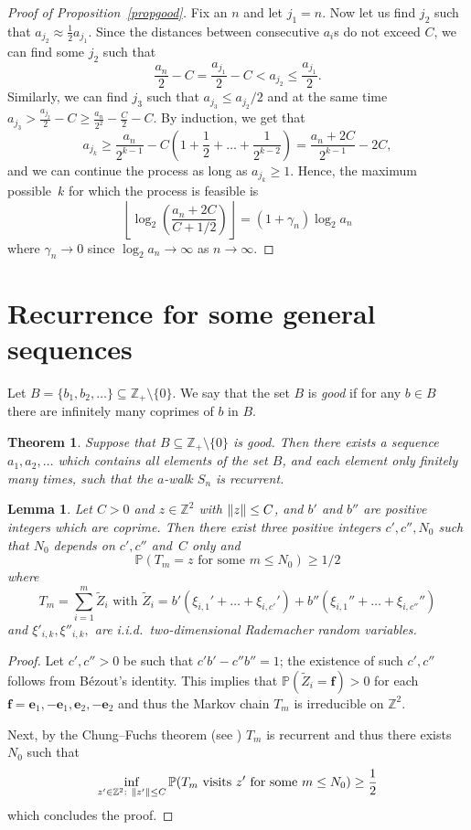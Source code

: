 \documentclass[12pt]{article}
\newtheorem{theorem}{Theorem}
\newtheorem{lemma}{Lemma}
\renewcommand\P{\mathbb{P}}
\newcommand\Z{\mathbb{Z}}
\newcommand\g{\gamma}
\newcommand\be{\mathbf{e}}
\DeclarePairedDelimiter{\norm}{\lVert}{\rVert}
\begin{document}
\begin{proof}[Proof of Proposition~\ref{propgood}]
Fix an $n$ and let $j_1=n$. Now let us find $j_2$ such that $a_{j_2}\approx \frac12 a_{j_1}$. Since the distances between consecutive $a_i$s do not exceed $C$, we can find some $j_2$ such that
$$
\frac{a_{n}}2-C=\frac{a_{j_1}}2-C< a_{j_2}\le \frac{a_{j_1}}2.
$$
Similarly, we can find $j_3$ such that $a_{j_3}\le a_{j_2}/2$ and at the same time
$
 a_{j_3}> \frac{a_{j_2}}2-C\ge \frac{a_{n}}{2^2}-\frac C2-C.
$
By induction, we get that
$$
a_{j_k}\ge \frac{a_n}{2^{k-1}}-C\left(1+\frac12+\dots+\frac1{2^{k-2}}\right)=
\frac{a_n+2C}{2^{k-1}}-2C,
$$
and we can continue the process as long as $a_{j_k}\ge 1$. Hence, the maximum possible~$k$ for which the process is feasible is 
$$
\left\lfloor \log_2\left(  \frac{a_n+2C}{C+1/2}\right) \right\rfloor
=(1+\g_n)\log_2 a_n
$$
where $\g_n\to 0$ since $\log_2 a_n\to\infty$ as $n\to\infty$.
\end{proof}

\section{Recurrence for some general sequences}\label{SecR}

Let $B=\{b_1,b_2,\dots\}\subseteq \Z_+\setminus\{0\}$. We say that the set $B$ is {\em good} if for any $b\in B$ there are infinitely many coprimes of $b$ in $B$. 

\begin{theorem}\label{trec}
Suppose that $B\subseteq \Z_+\setminus\{0\}$ is good. Then there exists a sequence $a_1,a_2,\dots$   which contains all elements of the set $B$, and each element only finitely many times, such that the $a$-walk $S_n$ is recurrent.
\end{theorem}

\begin{lemma}\label{lemmaCF}
Let $C>0$ and $z\in\Z^2$ with $\norm{z}\le C$, and $b'$ and $b''$ are positive integers which are coprime. Then there exist three positive integers $c',c'', N_0$  such that $N_0$ depends on $c',c''$ and~$C$ only and
$$
\P(T_m=z\text{ for some }m\le N_0)\ge 1/2
$$
where
$$
T_m=\sum_{i=1}^m \tilde Z_i    \text{     with }
\tilde Z_i=b'(\xi_{i,1}'+\dots+\xi_{i,c'}')+b''(\xi_{i,1}''+\dots+\xi_{i,c''}'')
$$
and $\xi'_{i,k},\xi''_{i,k},$  are i.i.d.\ two-dimensional Rademacher random variables.  
\end{lemma}
\begin{proof}
Let $c',c''>0$ be such that $c'b'-c''b''=1$; the existence of such $c',c''$ follows from Bézout's identity. This implies that $\P(\tilde Z_i=\mathbf{f})> 0$  for each $\mathbf{f}=\be_1,-\be_1,\be_2,-\be_2$ and thus the Markov chain $T_m$ is irreducible on $\Z^2$.  

Next, by the Chung–Fuchs theorem (see \cite{Chung}) $T_m$ is recurrent and thus there exists $N_0$ such that 
$$
\inf_{z'\in \Z^2:\ \norm{z'}\le C} \P(T_m\text{ visits }z'\text{ for some }m\le N_0)\ge \frac12
$$
which concludes the proof.
\end{proof}
\end{document}
